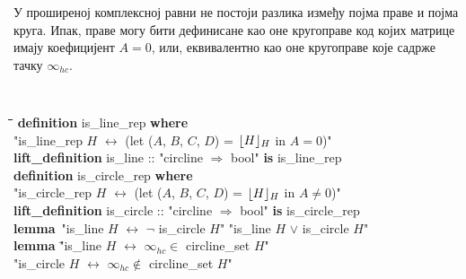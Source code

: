 У проширеној комплексној равни не постоји разлика између појма праве и
појма круга. Ипак, праве могу бити дефинисане као оне кругоправе код
којих матрице имају коефицијент $A = 0$, или, еквивалентно као оне
кругоправе које садрже тачку $\infty_{hc}$.

{\tt
\begin{tabbing}
\hspace{5mm}\=\hspace{5mm}\=\hspace{5mm}\=\hspace{5mm}\=\hspace{5mm}\=\kill
\textbf{definition} is\_line\_rep  \textbf{where} \\
\>"is\_line\_rep $H$ $\longleftrightarrow$ (let ($A$, $B$, $C$, $D$) = $\lfloor H\rfloor_{H}$ in $A = 0$)"\\
\textbf{lift\_definition} is\_line :: "circline $\Rightarrow$ bool" \textbf{is} is\_line\_rep\\
\textbf{definition} is\_circle\_rep  \textbf{where} \\
\>"is\_circle\_rep $H$ $\longleftrightarrow$ (let ($A$, $B$, $C$, $D$) = $\lfloor H\rfloor_{H}$ in $A \neq 0$)"\\
\textbf{lift\_definition} is\_circle :: "circline $\Rightarrow$ bool" \textbf{is} is\_circle\_rep\\
\textbf{lemma}\ "is\_line $H$ $\longleftrightarrow$ $\neg$ is\_circle $H$"   "is\_line $H$ $\vee$ is\_circle $H$"\\
\textbf{lemma} \="is\_line $H$ $\longleftrightarrow$ $\infty_{hc} \in$ circline\_set $H$"\\
\>"is\_circle $H$ $\longleftrightarrow$ $\infty_{hc} \notin$ circline\_set $H$"
\end{tabbing}
} 

